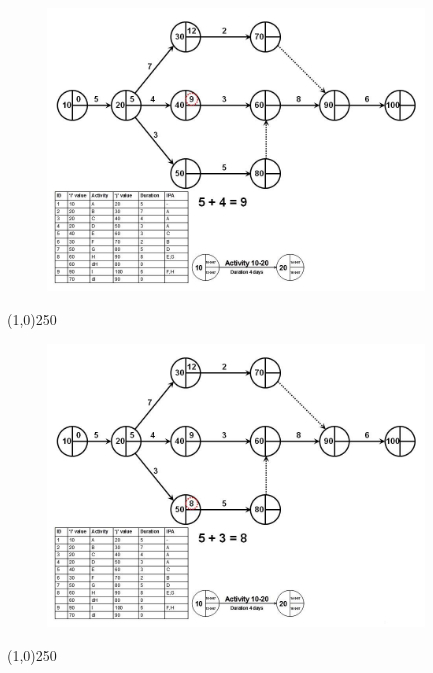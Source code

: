 \begin{frame}
\begin{figure}
	\centering
		\includegraphics[width = 10.0cm]{oldnotes/Slide104.jpg}
\end{figure}
\end{frame}
\begin{center}\line(1,0){250}\end{center}


\begin{frame}
\begin{figure}
	\centering
		\includegraphics[width = 10.0cm]{oldnotes/Slide105.jpg}
\end{figure}
\end{frame}
\begin{center}\line(1,0){250}\end{center}


